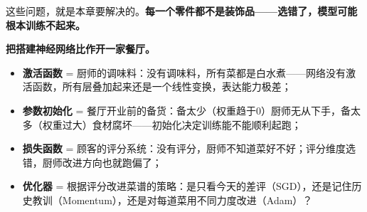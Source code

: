 \documentclass[a4paper,11pt]{ctexart}
\begin{document}
这些问题，就是本章要解决的。\textbf{每一个零件都不是装饰品——选错了，模型可能根本训练不起来。}

\begin{metaphorbox}
    \textbf{把搭建神经网络比作开一家餐厅。}

    \begin{itemize}
        \item \textbf{激活函数} = 厨师的调味料：没有调味料，所有菜都是白水煮——网络没有激活函数，所有层叠加起来还是一个线性变换，表达能力极差；
        \item \textbf{参数初始化} = 餐厅开业前的备货：备太少（权重趋于0）厨师无从下手，备太多（权重过大）食材腐坏——初始化决定训练能不能顺利起跑；
        \item \textbf{损失函数} = 顾客的评分系统：没有评分，厨师不知道菜好不好；评分维度选错，厨师改进方向也就跑偏了；
        \item \textbf{优化器} = 根据评分改进菜谱的策略：是只看今天的差评（SGD），还是记住历史教训（Momentum），还是对每道菜用不同力度改进（Adam）？
    \end{itemize}
\end{metaphorbox}
\end{document}
